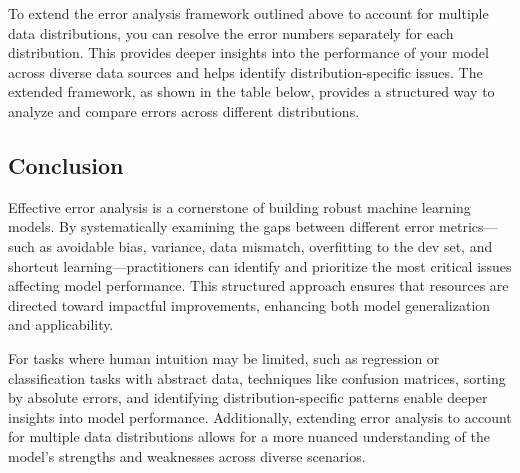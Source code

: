 \documentclass[12pt,openany]{book}
\begin{document}
To extend the error analysis framework outlined above to account for multiple data distributions, you can resolve the error numbers separately for each distribution. This provides deeper insights into the performance of your model across diverse data sources and helps identify distribution-specific issues. The extended framework, as shown in the table below, provides a structured way to analyze and compare errors across different distributions.

\begin{table}[ht!]
\caption{Extended technique for error analysis to resolve for the different data distributions.}
\label{tab:errors_distributions}
\centering
{}
\end{table}


\subsection{Conclusion}
Effective error analysis is a cornerstone of building robust machine learning models. By systematically examining the gaps between different error metrics—such as avoidable bias, variance, data mismatch, overfitting to the dev set, and shortcut learning—practitioners can identify and prioritize the most critical issues affecting model performance. This structured approach ensures that resources are directed toward impactful improvements, enhancing both model generalization and applicability. \newline

For tasks where human intuition may be limited, such as regression or classification tasks with abstract data, techniques like confusion matrices, sorting by absolute errors, and identifying distribution-specific patterns enable deeper insights into model performance. Additionally, extending error analysis to account for multiple data distributions allows for a more nuanced understanding of the model’s strengths and weaknesses across diverse scenarios. \newline
\end{document}
